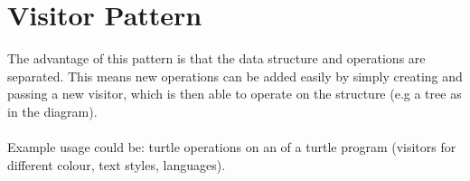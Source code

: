 \documentclass{report}
\begin{document}
\section*{Visitor Pattern}
The advantage of this pattern is that the data structure and operations are separated. This means new operations can be added easily by simply creating and passing a new visitor, which is then able to operate on the structure (e.g a tree as in the diagram).
\\
\\ Example usage could be: turtle operations on an  of a turtle program (visitors for different colour, text styles, languages).
\end{document}

